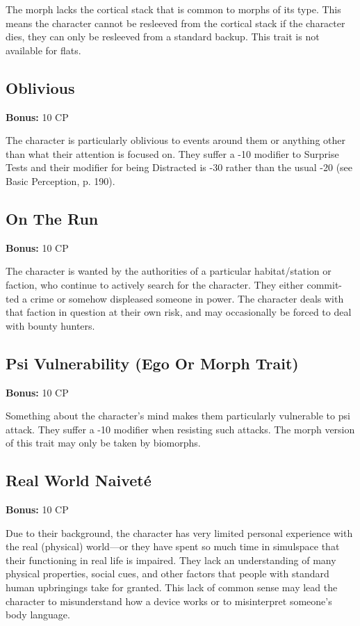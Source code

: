 The morph lacks the cortical stack that is common to morphs of its type. This means the character cannot be resleeved from the cortical stack if the character dies, they can only be resleeved from a standard backup. This trait is not available for flats.

\subsection{Oblivious}
\label{sec:traits-oblivious}

\textbf{Bonus:} 10 CP

The character is particularly oblivious to events around them or anything other than what their attention is focused on. They suffer a -10 modifier to Surprise Tests and their modifier for being Distracted is -30 rather than the usual -20 (see Basic Perception, p. 190).

\subsection{On The Run}
\label{sec:traits-on-the-run}

\textbf{Bonus:} 10 CP

The character is wanted by the authorities of a particular habitat/station or faction, who continue to actively search for the character. They either commit- ted a crime or somehow displeased someone in power. The character deals with that faction in question at their own risk, and may occasionally be forced to deal with bounty hunters.

\subsection{Psi Vulnerability (Ego Or Morph Trait)}
\label{sec:traits-psi-vulnerability}

\textbf{Bonus:} 10 CP

Something about the character’s mind makes them particularly vulnerable to psi attack. They suffer a -10 modifier when resisting such attacks. The morph version of this trait may only be taken by biomorphs.

\subsection{Real World Naiveté}
\label{sec:traits-real-world-naivite}

\textbf{Bonus:} 10 CP

Due to their background, the character has very limited personal experience with the real (physical) world—or they have spent so much time in simulspace that their functioning in real life is impaired. They lack an understanding of many physical properties, social cues, and other factors that people with standard human upbringings take for granted. This lack of common sense may lead the character to misunderstand how a device works or to misinterpret someone’s body language.

